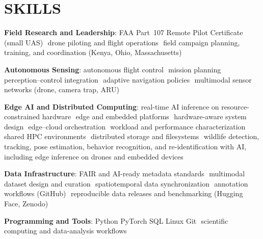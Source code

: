 \section{SKILLS}
{\small
\renewcommand{\arraystretch}{1.15}
\newcommand{\sk}{\,\textperiodcentered\,\allowbreak}

\textbf{Field Research and Leadership}:
FAA Part~107 Remote Pilot Certificate (small UAS)\sk
drone piloting and flight operations\sk
field campaign planning, training, and coordination (Kenya, Ohio, Massachusetts)

\textbf{Autonomous Sensing}: autonomous flight control\sk
mission planning\sk
perception--control integration\sk
adaptive navigation policies\sk
multimodal sensor networks (drone, camera trap, ARU)


\textbf{Edge AI and Distributed Computing}: real-time AI inference on resource-constrained hardware\sk
edge and embedded platforms\sk
hardware-aware system design\sk
edge--cloud orchestration\sk
workload and performance characterization\sk
shared HPC environments\sk
distributed storage and filesystems\sk
wildlife detection, tracking, pose estimation, behavior recognition, and re-identification with AI,
including edge inference on drones and embedded devices

\textbf{Data Infrastructure}: FAIR and AI-ready metadata standards\sk
multimodal dataset design and curation\sk
spatiotemporal data synchronization\sk
annotation workflows (GitHub)\sk
reproducible data releases and benchmarking (Hugging Face, Zenodo) 

\textbf{Programming and Tools}: Python\sk PyTorch\sk SQL\sk Linux\sk Git\sk
scientific computing and data-analysis workflows 


}
